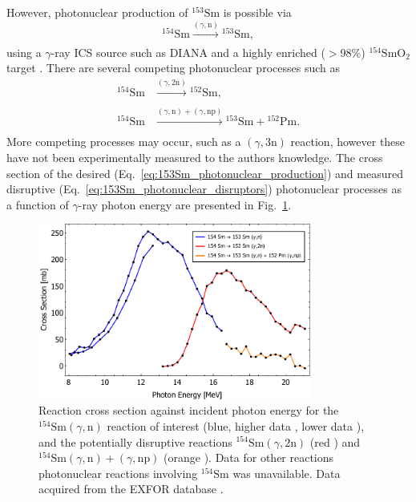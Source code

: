 \documentclass[../main.tex]{subfiles}
\begin{document}
However, photonuclear production of $^{153}\mathrm{Sm}$ \cite{carlos1974giant,filipescu2014photoneutron} is possible via
\begin{equation}
^{154}\mathrm{Sm}\xrightarrow[]{\left(\gamma,\mathrm{n}\right)}{}^{153}\mathrm{Sm},
\label{eq:153Sm_photonuclear_production}    
\end{equation}
using a $\gamma$-ray ICS source such as DIANA and a highly enriched ($>$98\%) $^{154}\mathrm{SmO}_{2}$ target \cite{bell1987stable,isoflex2021sm}. There are several competing photonuclear processes such as \cite{carlos1974giant}
\begin{align}
^{154}\mathrm{Sm}&\xrightarrow[]{\left(\gamma,2\mathrm{n}\right)}{}^{152}\mathrm{Sm},\\
^{154}\mathrm{Sm}&\xrightarrow[]{\left(\gamma,\mathrm{n}\right)+\left(\gamma,\mathrm{np}\right)}{}^{153}\mathrm{Sm}+{}^{152}\mathrm{Pm}.
\label{eq:153Sm_photonuclear_disruptors}    
\end{align}
More competing processes may occur, such as a $\left(\gamma,3\mathrm{n}\right)$ reaction, however these have not been experimentally measured to the authors knowledge. The cross section of the desired (Eq.~\ref{eq:153Sm_photonuclear_production}) and measured disruptive (Eq.~\ref{eq:153Sm_photonuclear_disruptors}) photonuclear processes as a function of $\gamma$-ray photon energy are presented in Fig.~\ref{fig:154Sm_cross_section_photon_energy}.
\begin{figure}[!h]
\centering
\includegraphics[width=0.8\textwidth]{Figures/DIANA_Inverse_Compton_Source_Design/Sm154Landscape.pdf}
\caption{Reaction cross section against incident photon energy for the $^{154}\mathrm{Sm} \left(\gamma,\mathrm{n}\right)$ reaction of interest (blue, higher data \cite{carlos1974giant}, lower data \cite{filipescu2014photoneutron}), and the potentially disruptive reactions $^{154}\mathrm{Sm} \left(\gamma,2\mathrm{n}\right)$ (red \cite{carlos1974giant}) and $^{154}\mathrm{Sm} \left(\gamma,\mathrm{n}\right) + \left(\gamma,\mathrm{np}\right)$ (orange \cite{carlos1974giant}). Data for other reactions photonuclear reactions involving $^{154}\mathrm{Sm}$ was unavailable. Data acquired from the EXFOR database \cite{zerkin2018experimental}. }
\label{fig:154Sm_cross_section_photon_energy}
\end{figure}
\end{document}
